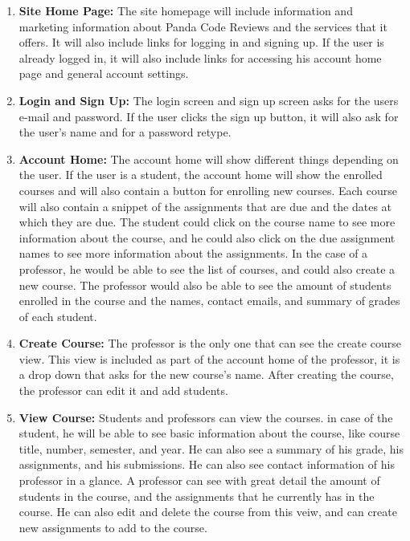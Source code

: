 \begin{enumerate}

\item \textbf{Site Home Page:} The site homepage will include information and
marketing information about Panda Code Reviews and the services that it offers.
It will also include links for logging in and signing up. If the user is
already logged in, it will also include links for accessing his account
home page and general account settings.

\item \textbf{Login and Sign Up:} The login screen and sign up screen asks for
the users e-mail and password. If the user clicks the sign up button, it will
also ask for the user's name and for a password retype.

\item \textbf{Account Home:} The account home will show different things
depending on the user. If the user is a student, the account home will show the
enrolled courses and will also contain a button for enrolling new courses. Each
course will also contain a snippet of the assignments that are due and the
dates at which they are due. The student could click on the course name to see
more information about the course, and he could also click on the due
assignment names to see more information about the assignments. In the case of
a professor, he would be able to see the list of courses, and could also create
a new course. The professor would also be able to see the amount of students
enrolled in the course and the names, contact emails, and summary of grades of
each student.

\item \textbf{Create Course:} The professor is the only one that can see the
create course view. This view is included as part of the account home of the
professor, it is a drop down that asks for the new course's name. After
creating the course, the professor can edit it and add students.

\item \textbf{View Course:} Students and professors can view the courses. in
case of the student, he will be able to see basic information about the course,
like course title, number, semester, and year. He can also see a summary of his
grade, his assignments, and his submissions. He can also see contact
information of his professor in a glance. A professor can see with great detail
the amount of students in the course, and the assignments that he currently has
in the course. He can also edit and delete the course from this veiw, and can
create new assignments to add to the course.


\end{enumerate}
